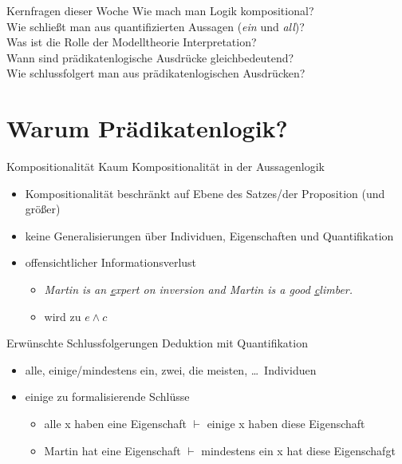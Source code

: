\begin{frame}
  {Kernfragen dieser Woche}
  \onslide<+->
  \onslide<+->
  \Large
  \centering 
  Wie mach man Logik \alert{kompositional}?\\
  \onslide<+->
  \Halbzeile
  Wie schließt man aus quantifizierten Aussagen (\textit{ein} und \textit{all})?\\
  \onslide<+->
  \Halbzeile
  Was ist die Rolle der \alert{Modelltheorie} Interpretation?\\
  \onslide<+->
  \Halbzeile
  Wann sind prädikatenlogische Ausdrücke \alert{gleichbedeutend}?\\
  \onslide<+->
  \Halbzeile
  Wie \alert{schlussfolgert} man aus prädikatenlogischen Ausdrücken?
\end{frame}

\section{Warum Prädikatenlogik?}

\begin{frame}
  {Kompositionalität}
  \onslide<+->
  \onslide<+->
  Kaum Kompositionalität in der Aussagenlogik\\
  \Halbzeile
  \begin{itemize}[<+->]
    \item Kompositionalität beschränkt auf Ebene des \alert{Satzes\slash der Proposition} (und größer)
    \item keine Generalisierungen über \alert{Individuen}, \alert{Eigenschaften} und \alert{Quantifikation}
    \item offensichtlicher Informationsverlust
      \begin{itemize}[<+->]
        \item \textit{Martin is an \underline{e}xpert on inversion and Martin is a good \underline{c}limber.}
        \item wird zu $e\wedge c$
      \end{itemize}
  \end{itemize}
\end{frame}

\begin{frame}
  {Erwünschte Schlussfolgerungen}
  \onslide<+->
  \onslide<+->
  Deduktion mit Quantifikation\\
  \Halbzeile
  \begin{itemize}[<+->]
    \item alle, einige\slash mindestens ein, zwei, die meisten, \ldots\ Individuen
    \item einige zu formalisierende Schlüsse
      \begin{itemize}[<+->]
        \item \alert{alle x} haben eine Eigenschaft $\vdash$ \alert{einige x} haben diese Eigenschaft
        \item \alert{Martin} hat eine Eigenschaft $\vdash$ \alert{mindestens ein x} hat diese Eigenschafgt
      \end{itemize}
  \end{itemize}
\end{frame}

